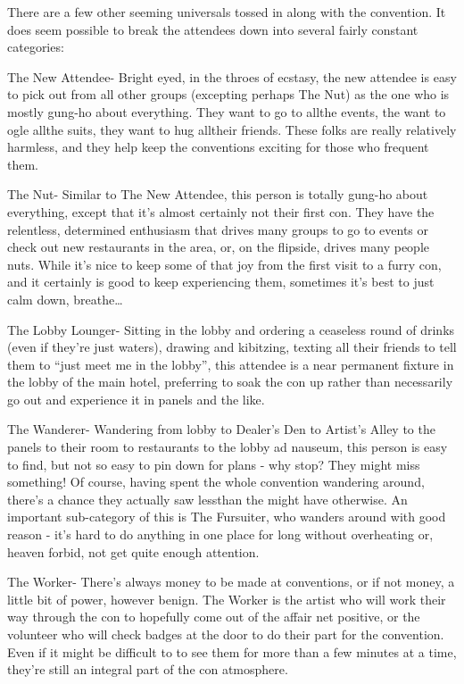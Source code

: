 There are a few other seeming universals tossed in along with the convention. It does seem possible to break the attendees down into several fairly constant categories:

The New Attendee- Bright eyed, in the throes of ecstasy, the new attendee is easy to pick out from all other groups (excepting perhaps The Nut) as the one who is mostly gung-ho about everything. They want to go to allthe events, the want to ogle allthe suits, they want to hug alltheir friends. These folks are really relatively harmless, and they help keep the conventions exciting for those who frequent them.

The Nut- Similar to The New Attendee, this person is totally gung-ho about everything, except that it's almost certainly not their first con. They have the relentless, determined enthusiasm that drives many groups to go to events or check out new restaurants in the area, or, on the flipside, drives many people nuts. While it's nice to keep some of that joy from the first visit to a furry con, and it certainly is good to keep experiencing them, sometimes it's best to just calm down, breathe\ldots{}

The Lobby Lounger- Sitting in the lobby and ordering a ceaseless round of drinks (even if they're just waters), drawing and kibitzing, texting all their friends to tell them to ``just meet me in the lobby'', this attendee is a near permanent fixture in the lobby of the main hotel, preferring to soak the con up rather than necessarily go out and experience it in panels and the like.

The Wanderer- Wandering from lobby to Dealer's Den to Artist's Alley to the panels to their room to restaurants to the lobby ad nauseum, this person is easy to find, but not so easy to pin down for plans - why stop? They might miss something! Of course, having spent the whole convention wandering around, there's a chance they actually saw lessthan the might have otherwise. An important sub-category of this is The Fursuiter, who wanders around with good reason - it's hard to do anything in one place for long without overheating or, heaven forbid, not get quite enough attention.

The Worker- There's always money to be made at conventions, or if not money, a little bit of power, however benign. The Worker is the artist who will work their way through the con to hopefully come out of the affair net positive, or the volunteer who will check badges at the door to do their part for the convention. Even if it might be difficult to to see them for more than a few minutes at a time, they're still an integral part of the con atmosphere.

